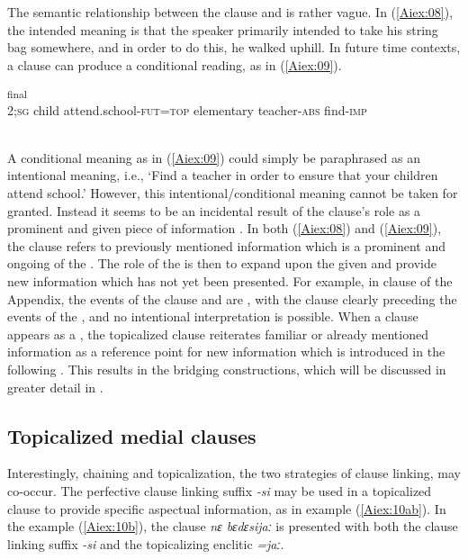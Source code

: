 \documentclass[output=paper]{LSP/langsci}
\begin{document}
The semantic relationship between the  clause and  is rather vague. In (\ref{Aiex:08}), the intended meaning is that the speaker primarily intended to take his string bag somewhere, and in order to do this, he walked uphill. In future time contexts, a  clause can produce a conditional reading, as in (\ref{Aiex:09}).

\begin{exe}
\ex \label{Aiex:09}
\textsubscript{final}\\
\textsc{2;sg}	child	attend.school-\textsc{fut}=\textsc{top}	elementary	teacher-\textsc{abs}	find-\textsc{imp}\\
\glt {}\\
\end{exe}

A conditional meaning as in (\ref{Aiex:09}) could simply be paraphrased as an intentional meaning, i.e., `Find a teacher in order to ensure that your children attend school.'
	However, this intentional/conditional meaning cannot be taken for granted. Instead it seems to be an incidental result of the  clause’s role as a prominent and given piece of information \citep{haiman.1978}. In both (\ref{Aiex:08}) and (\ref{Aiex:09}), the  clause refers to previously mentioned information which is a prominent and ongoing  of the . The role of the  is then to expand upon the given  and provide new information which has not yet been presented. For example, in clause  of the Appendix, the events of the  clause and  are , with the  clause clearly preceding the events of the , and no intentional interpretation is possible. When a clause appears as a , the topicalized clause reiterates familiar or already mentioned information as a reference point for new information which is introduced in the following . This results in the bridging constructions, which will be discussed in greater detail in .

\subsection{Topicalized medial clauses} 
\label{AiTopicalized.medial}
Interestingly, chaining and topicalization, the two strategies of clause linking, may co-occur. The perfective clause linking suffix \textit{-si} may be used in a topicalized clause to provide specific aspectual information, as in example (\ref{Aiex:10ab}). In the example (\ref{Aiex:10b}), the clause \textit{nɛ bɛdɛsijaː} is presented with both the clause linking suffix \textit{-si} and the topicalizing enclitic \textit{=jaː}.
\end{document}

